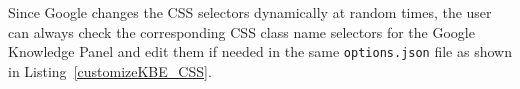 Since Google changes the CSS selectors dynamically at random times, the user can always check the corresponding CSS class name selectors for the Google Knowledge Panel and edit them if needed in the same \texttt{options.json} file as shown in Listing~\ref{customizeKBE_CSS}.

